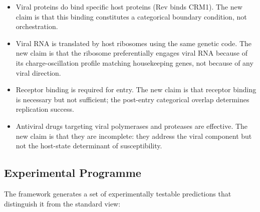 \documentclass[12pt,a4paper]{article}
\theoremstyle{definition}
\theoremstyle{remark}
\begin{document}
\begin{itemize}
  \item Viral proteins do bind specific host proteins (Rev binds CRM1). The new claim is that this binding constitutes a categorical boundary condition, not orchestration.
  \item Viral RNA is translated by host ribosomes using the same genetic code. The new claim is that the ribosome preferentially engages viral RNA because of its charge-oscillation profile matching housekeeping genes, not because of any viral direction.
  \item Receptor binding is required for entry. The new claim is that receptor binding is necessary but not sufficient; the post-entry categorical overlap determines replication success.
  \item Antiviral drugs targeting viral polymerases and proteases are effective. The new claim is that they are incomplete: they address the viral component but not the host-state determinant of susceptibility.
\end{itemize}

\subsection{Experimental Programme}

The framework generates a set of experimentally testable predictions that distinguish it from the standard view:
\end{document}
